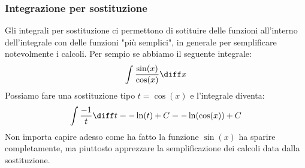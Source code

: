 \subsubsection{Integrazione per sostituzione}
Gli integrali per sostituzione ci permettono di sotituire delle funzioni all'interno dell'integrale con delle funzioni "più semplici", in generale per semplificare notevolmente i calcoli. Per sempio se abbiamo il seguente integrale:
\begin{equation*}
	\int \dfrac{\sin(x)}{\cos(x)} \diff x
\end{equation*}
Possiamo fare una sostituzione tipo $t = \cos(x)$ e l'integrale diventa:
\begin{equation*}
	\int \dfrac{-1}{t} \diff t = -\ln (t) + C = -\ln(\cos(x)) + C
\end{equation*}
Non importa capire adesso come ha fatto la funzione $\sin(x)$ ha sparire completamente, ma piuttosto apprezzare la semplificazione dei calcoli data dalla sostituzione.


